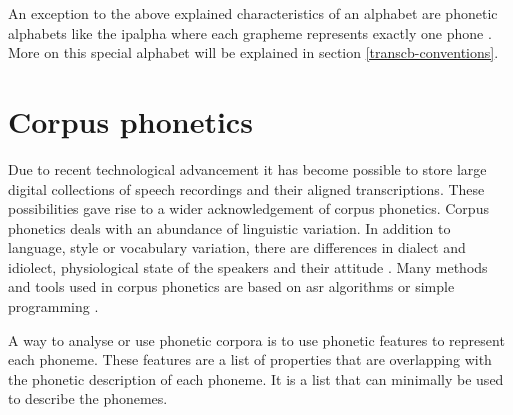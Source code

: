 
An exception to the above explained characteristics of an alphabet are phonetic alphabets like the \ac{ipalpha} where each grapheme represents exactly one phone  \citep{writing-systems}. More on this special alphabet will be explained in section \ref{transcb-conventions}.



\section{Corpus phonetics}
Due to recent technological advancement it has become possible to store large digital collections of speech recordings and their aligned transcriptions. These possibilities gave rise to a wider acknowledgement of corpus phonetics. Corpus phonetics deals with an abundance of linguistic variation. In addition to language, style or vocabulary variation, there are differences in dialect and idiolect, physiological state of the speakers and their attitude \citep{Liberman.2019, Chodroff.19.07.2019}. Many methods and tools used in corpus phonetics are based on \ac{asr} algorithms or simple programming \citep{Chodroff.19.07.2019}.

A way to analyse or use phonetic corpora is to use phonetic features to represent each phoneme. These features are a list of properties that are overlapping with the phonetic description of each phoneme. It is a list that can minimally be used to describe the phonemes. 

